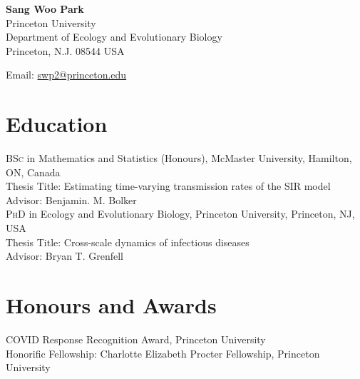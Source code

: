 \documentclass[11pt]{article} %
\begin{document}

{\LARGE\bfseries Sang Woo Park} %
\bigskip\\ %

Princeton University\\ %
Department of Ecology and Evolutionary Biology\\
Princeton, N.J. 08544 USA
\medskip %

Email: \href{mailto:swp2@princeton.edu}{swp2@princeton.edu} %


\section*{Education}

\textsc{BSc} in Mathematics and Statistics (Honours), McMaster University, Hamilton, ON, Canada\\
Thesis Title: Estimating time-varying transmission rates of the SIR model\\
Advisor: Benjamin. M. Bolker\\

\textsc{PhD} in Ecology and Evolutionary Biology, Princeton University, Princeton, NJ, USA\\
Thesis Title: Cross-scale dynamics of infectious diseases\\
Advisor: Bryan T. Grenfell


\section*{Honours and Awards}

 COVID Response Recognition Award, Princeton University\\

 Honorific Fellowship: Charlotte Elizabeth Procter Fellowship, Princeton University\\
\end{document}
